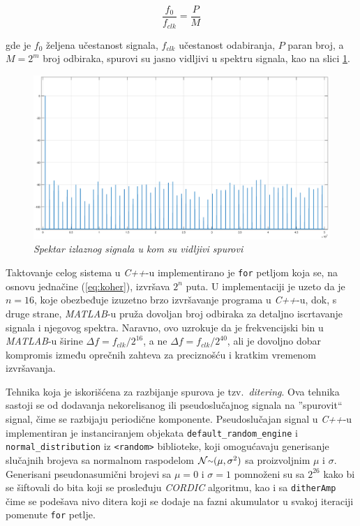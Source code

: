 \documentclass[conference]{IEEEtran}
\begin{document}
\begin{equation}\label{eq:koher}
\frac{f_{0}}{f_{clk}} = \frac{P}{M}
\end{equation}

\noindent gde je $f_{0}$ željena učestanost signala, $f_{clk}$ učestanost odabiranja, $P$ paran broj, a $M=2^m$ broj odbiraka, spurovi su jasno vidljivi u spektru signala, kao na slici \ref{slika:spur}.

\begin{figure}[h]
	\centering
	\includegraphics[scale=0.15]{./slike/spur.eps}
	\caption{\textsl{Spektar izlaznog signala u kom su vidljivi spurovi}}
	\label{slika:spur}
\end{figure}

Taktovanje celog sistema u \textit{C++}-u implementirano je \texttt{for} petljom koja se, na osnovu jednačine (\ref{eq:koher}), izvršava $2^n$ puta. U implementaciji je uzeto da je $n=16$, koje obezbeđuje izuzetno brzo izvršavanje programa u \textit{C++}-u, dok, s druge strane, \textit{MATLAB}-u pruža dovoljan broj odbiraka za detaljno iscrtavanje signala i njegovog spektra. Naravno, ovo uzrokuje da je frekvencijski bin u \textit{MATLAB}-u širine $\Delta f=f_{clk}/2^{16}$, a ne $\Delta f=f_{clk}/2^{40}$, ali je dovoljno dobar kompromis između oprečnih zahteva za preciznošću i kratkim vremenom izvršavanja.

Tehnika koja je iskorišćena za razbijanje spurova je tzv.~\textit{ditering}. Ova tehnika sastoji se od dodavanja nekorelisanog ili pseudoslučajnog signala na ''spurovit`` signal, čime se razbijaju periodične komponente. Pseudoslučajan signal u \textit{C++}-u implementiran je instanciranjem objekata \texttt{default\_random\_engine} i \texttt{normal\_distribution} iz \texttt{<random>} biblioteke, koji omogućavaju generisanje slučajnih brojeva sa normalnom raspodelom $\mathcal{N} {\raise.17ex\hbox{$\scriptstyle\mathtt{\sim}$}} (\mu, \sigma^2)$ sa proizvoljnim $\mu$ i $\sigma$. Generisani pseudonasumični brojevi sa $\mu=0$ i $\sigma=1$ pomnoženi su sa $2^{26}$ kako bi se šiftovali do bita koji se prosleđuju \textit{CORDIC} algoritmu, kao i sa \texttt{ditherAmp} čime se podešava nivo ditera koji se dodaje na fazni akumulator u svakoj iteraciji pomenute \texttt{for} petlje.\pagebreak
\end{document}
